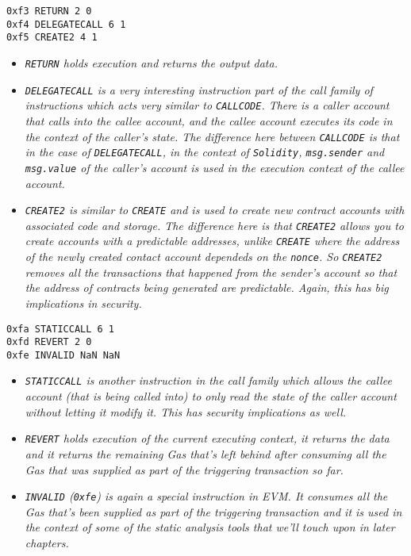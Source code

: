 \begin{lstlisting}[language=Solidity,numbers=none]
0xf3 RETURN 2 0
0xf4 DELEGATECALL 6 1
0xf5 CREATE2 4 1
\end{lstlisting}

\begin{itemize}
\tightlist
\item
  \emph{\texttt{RETURN} holds execution and returns the output data.}
\item
  \emph{\texttt{DELEGATECALL} is a very interesting instruction part of
  the call family of instructions which acts very similar to
  \texttt{CALLCODE}. There is a caller account that calls into the
  callee account, and the callee account executes its code in the
  context of the caller's state. The difference here between
  \texttt{CALLCODE} is that in the case of \texttt{DELEGATECALL}, in the
  context of \texttt{Solidity}, \texttt{msg.sender} and
  \texttt{msg.value} of the caller's account is used in the execution
  context of the callee account.}
\item
  \emph{\texttt{CREATE2} is similar to \texttt{CREATE} and is used to
  create new contract accounts with associated code and storage. The
  difference here is that \texttt{CREATE2} allows you to create accounts
  with a predictable addresses, unlike \texttt{CREATE} where the address
  of the newly created contact account dependeds on the \texttt{nonce}.
  So \texttt{CREATE2} removes all the transactions that happened from
  the sender's account so that the address of contracts being generated
  are predictable. Again, this has big implications in security.}
\end{itemize}

\begin{lstlisting}[language=Solidity,numbers=none]
0xfa STATICCALL 6 1
0xfd REVERT 2 0
0xfe INVALID NaN NaN
\end{lstlisting}

\begin{itemize}
\tightlist
\item
  \emph{\texttt{STATICCALL} is another instruction in the call family
  which allows the callee account (that is being called into) to only
  read the state of the caller account without letting it modify it.
  This has security implications as well.}
\item
  \emph{\texttt{REVERT} holds execution of the current executing
  context, it returns the data and it returns the remaining Gas that's
  left behind after consuming all the Gas that was supplied as part of
  the triggering transaction so far.}
\item
  \emph{\texttt{INVALID} (\texttt{0xfe}) is again a special instruction
  in EVM. It consumes all the Gas that's been supplied as part of the
  triggering transaction and it is used in the context of some of the
  static analysis tools that we'll touch upon in later chapters.}
\end{itemize}


